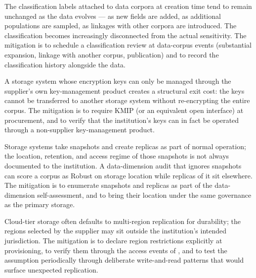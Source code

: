 \begin{pitfallbox}
\noindent The classification labels attached to data corpora at
creation time tend to remain unchanged as the data evolves --- as
new fields are added, as additional populations are sampled, as
linkages with other corpora are introduced. The classification
becomes increasingly disconnected from the actual sensitivity. The
mitigation is to schedule a classification review at data-corpus
events (substantial expansion, linkage with another corpus,
publication) and to record the classification history alongside the
data.
\end{pitfallbox}

\begin{pitfallbox}
\noindent A storage system whose encryption keys can only be managed
through the supplier's own key-management product creates a
structural exit cost: the keys cannot be transferred to another
storage system without re-encrypting the entire corpus. The
mitigation is to require KMIP (or an equivalent open interface) at
procurement, and to verify that the institution's keys can in fact
be operated through a non-supplier key-management product.
\end{pitfallbox}

\begin{pitfallbox}
\noindent Storage systems take snapshots and create replicas as part
of normal operation; the location, retention, and access regime of
those snapshots is not always documented to the institution. A
data-dimension audit that ignores snapshots can score a corpus as
Robust on storage location while replicas of it sit elsewhere. The
mitigation is to enumerate snapshots and replicas as part of the
data-dimension self-assessment, and to bring their location under
the same governance as the primary storage.
\end{pitfallbox}

\begin{pitfallbox}
\noindent Cloud-tier storage often defaults to multi-region
replication for durability; the regions selected by the supplier
may sit outside the institution's intended jurisdiction. The
mitigation is to declare region restrictions explicitly at
provisioning, to verify them through the access events of
, and to test the assumption
periodically through deliberate write-and-read patterns that would
surface unexpected replication.
\end{pitfallbox}
